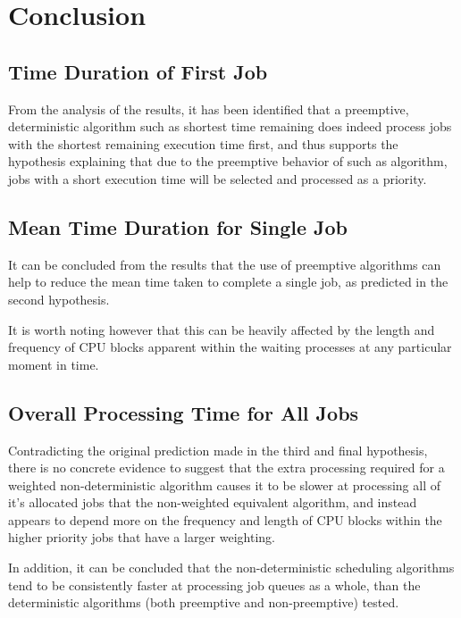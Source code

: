 \documentclass{acm_proc_article-sp}
\begin{document}
\section{Conclusion} 

\subsection{Time Duration of First Job}

From the analysis of the results, it has been identified that a preemptive, deterministic algorithm such as shortest time remaining does indeed process jobs with the shortest remaining execution time first, and thus supports the hypothesis explaining that due to the preemptive behavior of such as algorithm, jobs with a short execution time will be selected and processed as a priority. 

\subsection{Mean Time Duration for Single Job}

It can be concluded from the results that the use of preemptive algorithms can help to reduce the mean time taken to complete a single job, as predicted in the second hypothesis. 

It is worth noting however that this can be heavily affected by the length and frequency of CPU blocks apparent within the waiting processes at any particular moment in time. 

\subsection{Overall Processing Time for All Jobs}

Contradicting the original prediction made in the third and final hypothesis, there is no concrete evidence to suggest that the extra processing required for a weighted non-deterministic algorithm causes it to be slower at processing all of it's allocated jobs that the non-weighted equivalent algorithm, and instead appears to depend more on the frequency and length of CPU blocks within the higher priority jobs that have a larger weighting. 

In addition, it can be concluded that the non-deterministic scheduling algorithms tend to be consistently faster at processing job queues as a whole, than the deterministic algorithms (both preemptive and non-preemptive) tested.

\end{document}
